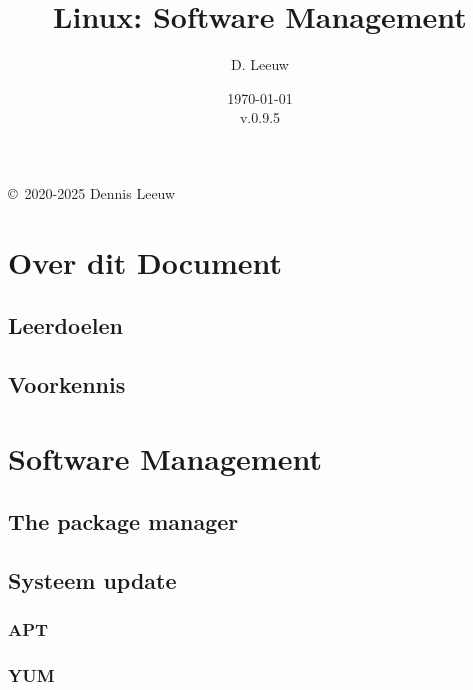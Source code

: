 \documentclass[a4paper,12pt,twoside,openright,titlepage]{book}
\author{D. Leeuw}
\title{Linux: Software Management}
\date{\today\\v.0.9.5}
\begin{document}

\maketitle

\copyright\ 2020-2025 Dennis Leeuw\\




\frontmatter
\chapter{Over dit Document}
\section{Leerdoelen}

\section{Voorkennis}

%
%

\tableofcontents

\mainmatter

\chapter{Software Management}

\section{The package manager}

\section{Systeem update}

\subsection{APT}

\subsection{YUM}

\end{document}
